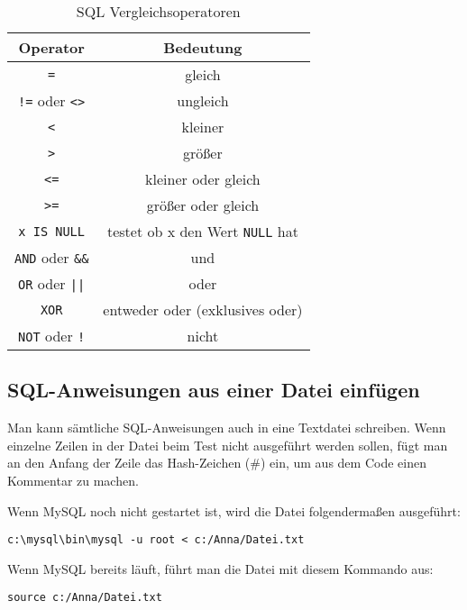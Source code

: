 \begin{table}[h]
\centering
\begin{tabular}{|c|c|}
\hline
\textbf{Operator} & \textbf{Bedeutung}\\ \hline
{\lstinline|=|} & gleich \\ \hline
{\lstinline|!=|} oder {\lstinline|<>|} & ungleich \\ \hline
{\lstinline|<|} & kleiner \\ \hline
{\lstinline|>|} & größer \\ \hline
{\lstinline|<=|} & kleiner oder gleich \\ \hline
{\lstinline|>=|} & größer oder gleich \\ \hline
{\lstinline|x IS NULL|} & testet ob x den Wert {\lstinline|NULL|} hat \\ \hline
{\lstinline|AND|} oder {\lstinline|&&|} & und \\ \hline
{\lstinline|OR|} oder {\lstinline!||!} & oder \\ \hline
{\lstinline|XOR|} & entweder oder (exklusives oder) \\ \hline
{\lstinline|NOT|} oder {\lstinline|!|} & nicht \\ \hline
\end{tabular}
\caption{SQL Vergleichsoperatoren}
\label{tab:sql-vergleichsoperatoren}
\end{table}


\subsection{SQL-Anweisungen aus einer Datei einfügen}

Man kann sämtliche SQL-Anweisungen auch in eine Textdatei schreiben. Wenn
einzelne Zeilen in der Datei beim Test nicht ausgeführt werden sollen, fügt man
an den Anfang der Zeile das \glqq Hash\grqq -Zeichen (\#) ein, um aus dem Code
einen Kommentar zu machen.

Wenn MySQL noch nicht gestartet ist, wird die Datei folgendermaßen ausgeführt:

\lstinline{c:\mysql\bin\mysql -u root < c:/Anna/Datei.txt}

Wenn MySQL bereits läuft, führt man die Datei mit diesem Kommando aus:

\lstinline{source c:/Anna/Datei.txt}